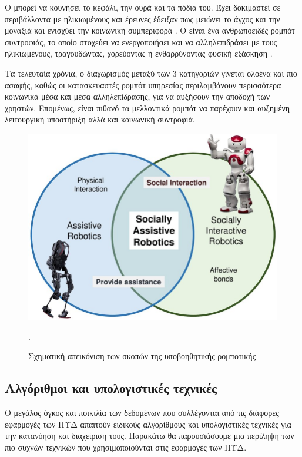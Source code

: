 Ο  μπορεί να κουνήσει το κεφάλι, την ουρά και τα πόδια του.
Έχει δοκιμαστεί σε περιβάλλοντα με ηλικιωμένους και έρευνες έδειξαν πως μειώνει το άγχος και την μοναξιά και ενισχύει την κοινωνική συμπεριφορά \cite{Kanamori2002}\cite{Tamura2004}.
Ο  είναι ένα ανθρωποειδές ρομπότ συντροφιάς, το οποίο στοχεύει να ενεργοποιήσει και να αλληλεπιδράσει με τους ηλικιωμένους, τραγουδώντας, χορεύοντας ή ενθαρρύνοντας φυσική εξάσκηση \cite{Helianthe2017}\cite{Melkas2016}\cite{Parviainen2016}.
\par
Τα τελευταία χρόνια, ο διαχωρισμός μεταξύ των 3 κατηγοριών γίνεται ολοένα και πιο ασαφής, καθώς οι κατασκευαστές ρομπότ υπηρεσίας περιλαμβάνουν περισσότερα κοινωνικά μέσα και μέσα αλληλεπίδρασης, για να αυξήσουν την αποδοχή των χρηστών.
Επομένως, είναι πιθανό τα μελλοντικά ρομπότ να παρέχουν και αυξημένη λειτουργική υποστήριξη αλλά και κοινωνική συντροφιά.
\begin{figure}[h!]
\centering
\includegraphics[scale=1]{images/robotics_end.jpg}
\caption{Σχηματική απεικόνιση των σκοπών της υποβοηθητικής ρομποτικής}.
\label{robot_end}
\end{figure}
\subsection{Αλγόριθμοι και υπολογιστικές τεχνικές}
Ο μεγάλος όγκος και ποικιλία των δεδομένων που συλλέγονται από τις διάφορες εφαρμογές των ΠΥΔ απαιτούν ειδικούς αλγορίθμους και υπολογιστικές τεχνικές για την κατανόηση και διαχείριση τους.
Παρακάτω θα παρουσιάσουμε μια περίληψη των πιο συχνών τεχνικών που χρησιμοποιούνται στις εφαρμογές των ΠΥΔ.

